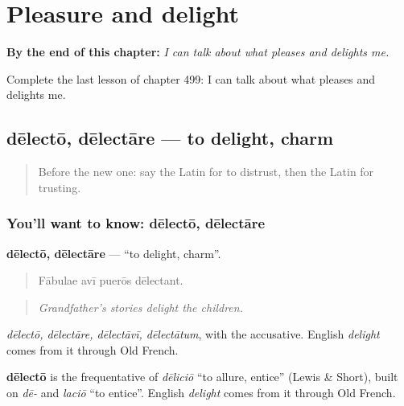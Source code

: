 
\chapter{Pleasure and delight}
\label{ch:la-pleasure-and-delight}

\begin{chapteropening}
\textbf{By the end of this chapter:} \emph{I can talk about what pleases and delights me.}

Complete the last lesson of chapter 499: I can talk about what pleases and delights me.
\end{chapteropening}

\section[dēlectō, dēlectāre]{dēlectō, dēlectāre — to delight, charm}

\label{lesson:LA-C499-delecto}



\begin{quote}
Before the new one: say the Latin for to distrust, then the Latin for trusting.
\end{quote}

\subsection*{You'll want to know: dēlectō, dēlectāre}
\textbf{dēlectō, dēlectāre} — \textquotedblleft{}to delight, charm\textquotedblright{}.

\begin{quote}
Fābulae avī puerōs dēlectant.
\end{quote}

\begin{quote}
\emph{Grandfather's stories delight the children.}
\end{quote}

\emph{dēlectō, dēlectāre, dēlectāvī, dēlectātum}, with the accusative. English \emph{delight} comes from it through Old French.

\begin{cousinweb}
\textbf{dēlectō} is the frequentative of \emph{dēliciō} \textquotedblleft{}to allure, entice\textquotedblright{} (Lewis \& Short), built on \emph{dē-} and \emph{laciō} \textquotedblleft{}to entice\textquotedblright{}. English \emph{delight} comes from it through Old French.
\end{cousinweb}

